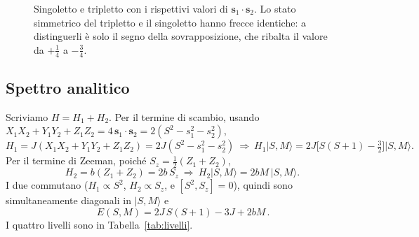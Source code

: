 \documentclass[11pt,a4paper]{article}
\newcommand{\ket}[1]{\lvert #1 \rangle}
\newcommand{\up}{\uparrow}
\newcommand{\dn}{\downarrow}
\renewcommand{\vec}[1]{\boldsymbol{#1}}
\newcommand{\sv}{\vec{s}}
\theoremstyle{definition}
\theoremstyle{remark}
\newcommand{\arrowup}[2]{\draw[spinup,line width=1.2pt,-{Stealth[length=2.4mm,width=2mm]}] (#1,{#2-0.22}) -- (#1,{#2+0.24});}
\newcommand{\arrowdn}[2]{\draw[spindown,line width=1.2pt,-{Stealth[length=2.4mm,width=2mm]}] (#1,{#2+0.22}) -- (#1,{#2-0.24});}
\begin{document}
\begin{figure}[htbp]
\centering
{}
\caption{Singoletto e tripletto con i rispettivi valori di $\sv_1\!\cdot\sv_2$. Lo stato simmetrico del
tripletto e il singoletto hanno frecce identiche: a distinguerli è solo il segno della sovrapposizione,
che ribalta il valore da $+\tfrac14$ a $-\tfrac34$.}
\label{fig:st}
\end{figure}

\FloatBarrier
\subsection{Spettro analitico}
\label{sub:spettro}

Scriviamo $H=H_1+H_2$. Per il termine di scambio, usando $X_1X_2+Y_1Y_2+Z_1Z_2=4\,\sv_1\!\cdot\sv_2=2(S^2-s_1^2-s_2^2)$,
\begin{equation}
H_1=J(X_1X_2+Y_1Y_2+Z_1Z_2)=2J(S^2-s_1^2-s_2^2)\ \Rightarrow\ H_1\ket{S,M}=2J\big[S(S+1)-\tfrac32\big]\ket{S,M}.
\end{equation}
Per il termine di Zeeman, poiché $S_z=\tfrac12(Z_1+Z_2)$,
\begin{equation}
H_2=b(Z_1+Z_2)=2b\,S_z\ \Rightarrow\ H_2\ket{S,M}=2bM\,\ket{S,M}.
\end{equation}
I due commutano ($H_1\propto S^2$, $H_2\propto S_z$, e $[S^2,S_z]=0$), quindi sono simultaneamente
diagonali in $\ket{S,M}$ e
\begin{equation}
\boxed{\,E(S,M)=2J\,S(S+1)-3J+2bM\,}.
\end{equation}
I quattro livelli sono in Tabella~\ref{tab:livelli}.
\end{document}
